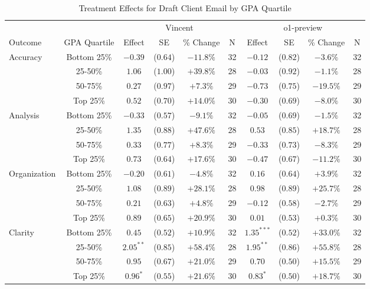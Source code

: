 \begin{table}[!htbp]
\centering
\caption{Treatment Effects for Draft Client Email by GPA Quartile}
\label{tab:task1_gpa}
\begin{tabular}{lccccccccc}
\hline\hline
& & \multicolumn{4}{c}{Vincent} & \multicolumn{4}{c}{o1-preview} \\
\cline{3-10}
Outcome & GPA Quartile & Effect & SE & \% Change & N & Effect & SE & \% Change & N \\
\hline
\multirow{4}{*}{Accuracy} & Bottom 25\% & $-0.39$ & ($0.64$) & $-11.8\%$ & 32 & $-0.12$ & ($0.82$) & $-3.6\%$ & 32 \\
& 25-50\% & $1.06$ & ($1.00$) & $+39.8\%$ & 28 & $-0.03$ & ($0.92$) & $-1.1\%$ & 28 \\
& 50-75\% & $0.27$ & ($0.97$) & $+7.3\%$ & 29 & $-0.73$ & ($0.75$) & $-19.5\%$ & 29 \\
& Top 25\% & $0.52$ & ($0.70$) & $+14.0\%$ & 30 & $-0.30$ & ($0.69$) & $-8.0\%$ & 30 \\
\hline
\multirow{4}{*}{Analysis} & Bottom 25\% & $-0.33$ & ($0.57$) & $-9.1\%$ & 32 & $-0.05$ & ($0.69$) & $-1.5\%$ & 32 \\
& 25-50\% & $1.35$ & ($0.88$) & $+47.6\%$ & 28 & $0.53$ & ($0.85$) & $+18.7\%$ & 28 \\
& 50-75\% & $0.33$ & ($0.77$) & $+8.3\%$ & 29 & $-0.33$ & ($0.73$) & $-8.3\%$ & 29 \\
& Top 25\% & $0.73$ & ($0.64$) & $+17.6\%$ & 30 & $-0.47$ & ($0.67$) & $-11.2\%$ & 30 \\
\hline
\multirow{4}{*}{Organization} & Bottom 25\% & $-0.20$ & ($0.61$) & $-4.8\%$ & 32 & $0.16$ & ($0.64$) & $+3.9\%$ & 32 \\
& 25-50\% & $1.08$ & ($0.89$) & $+28.1\%$ & 28 & $0.98$ & ($0.89$) & $+25.7\%$ & 28 \\
& 50-75\% & $0.21$ & ($0.63$) & $+4.8\%$ & 29 & $-0.12$ & ($0.58$) & $-2.7\%$ & 29 \\
& Top 25\% & $0.89$ & ($0.65$) & $+20.9\%$ & 30 & $0.01$ & ($0.53$) & $+0.3\%$ & 30 \\
\hline
\multirow{4}{*}{Clarity} & Bottom 25\% & $0.45$ & ($0.52$) & $+10.9\%$ & 32 & $1.35^{***}$ & ($0.52$) & $+33.0\%$ & 32 \\
& 25-50\% & $2.05^{**}$ & ($0.85$) & $+58.4\%$ & 28 & $1.95^{**}$ & ($0.86$) & $+55.8\%$ & 28 \\
& 50-75\% & $0.95$ & ($0.67$) & $+21.0\%$ & 29 & $0.70$ & ($0.50$) & $+15.5\%$ & 29 \\
& Top 25\% & $0.96^{*}$ & ($0.55$) & $+21.6\%$ & 30 & $0.83^{*}$ & ($0.50$) & $+18.7\%$ & 30 \\

\end{tabular}
\end{table}
